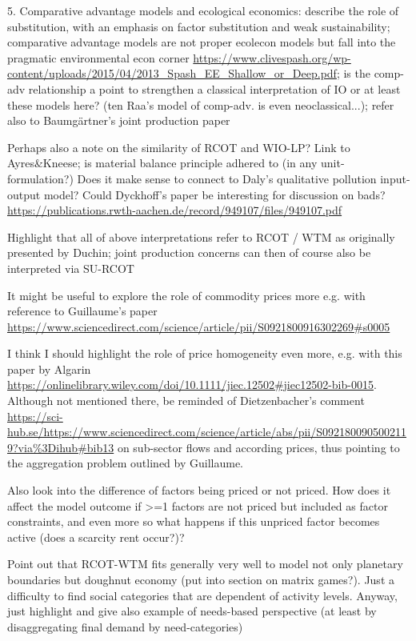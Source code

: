 \documentclass{article}
\begin{document}
\begin{refsection}
5. Comparative advantage models and ecological economics: describe the role of substitution, with an emphasis on factor substitution and weak sustainability; comparative advantage models are not proper ecolecon models but fall into the pragmatic environmental econ corner \url{https://www.clivespash.org/wp-content/uploads/2015/04/2013_Spash_EE_Shallow_or_Deep.pdf}; is the comp-adv relationship a point to strengthen a classical interpretation of IO or at least these models here? (ten Raa's model of comp-adv. is even neoclassical...); refer also to Baumgärtner's joint production paper

Perhaps also a note on the similarity of RCOT and WIO-LP?
Link to Ayres\&Kneese; is material balance principle adhered to (in any unit-formulation?)
Does it make sense to connect to Daly's qualitative pollution input-output model?
Could Dyckhoff's paper be interesting for discussion on bads? \url{https://publications.rwth-aachen.de/record/949107/files/949107.pdf}

Highlight that all of above interpretations refer to RCOT / WTM as originally presented by Duchin; joint production concerns can then of course also be interpreted via SU-RCOT

It might be useful to explore the role of commodity prices more e.g. with reference to Guillaume's paper \url{https://www.sciencedirect.com/science/article/pii/S0921800916302269#s0005}

I think I should highlight the role of price homogeneity even more, e.g. with this paper by Algarin \url{https://onlinelibrary.wiley.com/doi/10.1111/jiec.12502#jiec12502-bib-0015}. Although not mentioned there, be reminded of Dietzenbacher's comment \url{https://sci-hub.se/https://www.sciencedirect.com/science/article/abs/pii/S0921800905002119?via%3Dihub#bib13} on sub-sector flows and according prices, thus pointing to the aggregation problem outlined by Guillaume.

Also look into the difference of factors being priced or not priced. How does it affect the model outcome if >=1 factors are not priced but included as factor constraints, and even more so what happens if this unpriced factor becomes active (does a scarcity rent occur?)?

Point out that RCOT-WTM fits generally very well to model not only planetary boundaries but doughnut economy (put into section on matrix games?). Just a difficulty to find social categories that are dependent of activity levels. Anyway, just highlight and give also example of needs-based perspective (at least by disaggregating final demand by need-categories)


\end{refsection}
\end{document}
